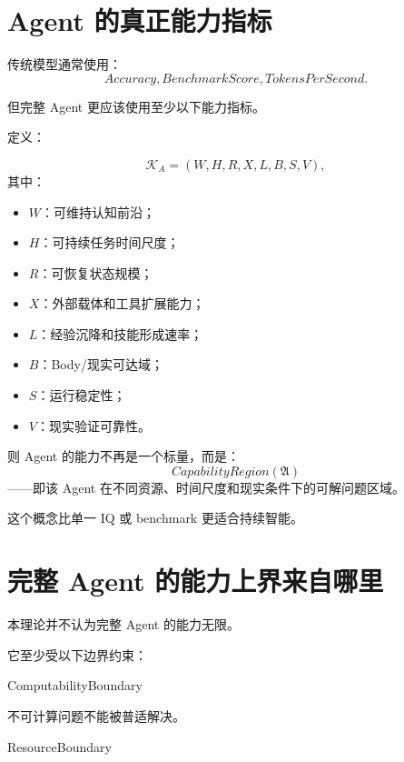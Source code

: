 \section{Agent 的真正能力指标}

传统模型通常使用：
\begin{equation}
Accuracy,
BenchmarkScore,
TokensPerSecond.
\end{equation}

但完整 Agent 更应该使用至少以下能力指标。

定义：

\begin{equation}
\mathcal K_A
=
\left(
W,
H,
R,
X,
L,
B,
S,
V
\right),
\end{equation}
其中：

\begin{itemize}
    \item $W$：可维持认知前沿；
    \item $H$：可持续任务时间尺度；
    \item $R$：可恢复状态规模；
    \item $X$：外部载体和工具扩展能力；
    \item $L$：经验沉降和技能形成速率；
    \item $B$：Body/现实可达域；
    \item $S$：运行稳定性；
    \item $V$：现实验证可靠性。
\end{itemize}

则 Agent 的能力不再是一个标量，而是：
\begin{equation}
\boxed{
CapabilityRegion(\mathfrak A)
}
\end{equation}
——即该 Agent 在不同资源、时间尺度和现实条件下的可解问题区域。

这个概念比单一 IQ 或 benchmark 更适合持续智能。

\section{完整 Agent 的能力上界来自哪里}

本理论并不认为完整 Agent 的能力无限。

它至少受以下边界约束：

\begin{statementbox}
ComputabilityBoundary
\end{statementbox}

不可计算问题不能被普适解决。

\begin{statementbox}
ResourceBoundary
\end{statementbox}

